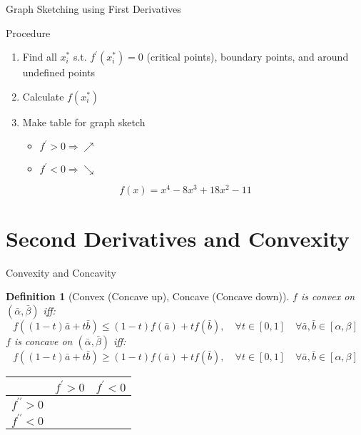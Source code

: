 \documentclass[final]{beamer}
\newtheorem{defn}{Definition}
\begin{document}
\begin{frame}[t]{Graph Sketching using First Derivatives}
	\begin{block}{Procedure}
		\begin{enumerate}[(STEP 1)]
			\item Find all $x_i^\ast$ s.t. $f^\prime (x_i^\ast)=0$ (critical points), boundary points, and around undefined points
			\item Calculate $f(x_i^\ast)$
			\item Make table for graph sketch
			\begin{itemize}
				\item $f^\prime >0 \Rightarrow \nearrow$
				\item $f^\prime <0 \Rightarrow \searrow$
			\end{itemize}
		\end{enumerate}
	\end{block}
	\[
		f(x) = x^4 -8x^3 + 18x^2 - 11 \tag{Ex3.1}
	\]
\end{frame}


\section{Second Derivatives and Convexity} %
\label{sec:second_derivatives}

\begin{frame}[t]{Convexity and Concavity}
	\begin{defn}
		[Convex (Concave up), Concave (Concave down)]
		$f$ is convex on $(\bar \alpha, \bar \beta)$ iff:
		\[
			f\left((1-t)\bar a + t \bar b \right)\le (1-t)f(\bar a)+ tf(\bar b),\quad \forall t\in [0,1] \quad\forall \bar a, \bar b \in [\alpha,\beta]
		\]
		$f$ is concave on $(\bar \alpha, \bar \beta)$ iff:
		\[
			f\left((1-t)\bar a + t \bar b \right) \ge (1-t)f(\bar a)+ tf(\bar b),\quad \forall t\in [0,1] \quad\forall \bar a, \bar b \in [\alpha,\beta]
		\]
	\end{defn}
	\begin{center}
		\begin{tabular}{c|c|c}
		&	$f^\prime >0 $& $f^\prime<0$	\\
		\hline\hline
		$f^{\prime\prime}>0$&	&\\
		\hline
		$f^{\prime\prime}<0$&&\\
		\end{tabular}
	\end{center}
\end{frame}
\end{document}

